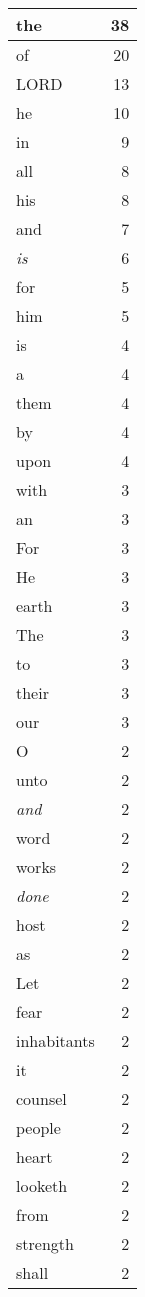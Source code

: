 \begin{center}
\begin{longtable}{l|r}
\hline \hline
\endlastfoot
the & 38 \\ \hline
of & 20 \\ \hline
LORD & 13 \\ \hline
he & 10 \\ \hline
in & 9 \\ \hline
all & 8 \\ \hline
his & 8 \\ \hline
and & 7 \\ \hline
\emph{is} & 6 \\ \hline
for & 5 \\ \hline
him & 5 \\ \hline
is & 4 \\ \hline
a & 4 \\ \hline
them & 4 \\ \hline
by & 4 \\ \hline
upon & 4 \\ \hline
with & 3 \\ \hline
an & 3 \\ \hline
For & 3 \\ \hline
He & 3 \\ \hline
earth & 3 \\ \hline
The & 3 \\ \hline
to & 3 \\ \hline
their & 3 \\ \hline
our & 3 \\ \hline
O & 2 \\ \hline
unto & 2 \\ \hline
\emph{and} & 2 \\ \hline
word & 2 \\ \hline
works & 2 \\ \hline
\emph{done} & 2 \\ \hline
host & 2 \\ \hline
as & 2 \\ \hline
Let & 2 \\ \hline
fear & 2 \\ \hline
inhabitants & 2 \\ \hline
it & 2 \\ \hline
counsel & 2 \\ \hline
people & 2 \\ \hline
heart & 2 \\ \hline
looketh & 2 \\ \hline
from & 2 \\ \hline
strength & 2 \\ \hline
shall & 2 \\ \hline

\end{longtable}
\end{center}
